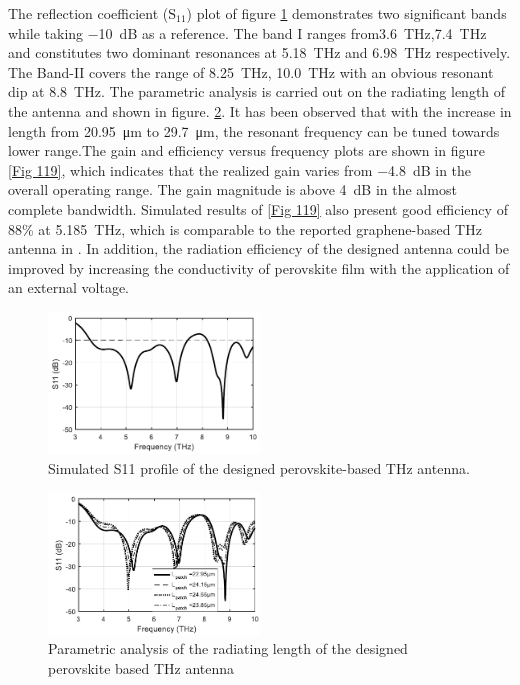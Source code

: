 \documentclass[12pt]{suhbook}
\begin{document}
The reflection coefficient ($\mathrm{S_{11}}$) plot of figure \ref{Fig 17} demonstrates two significant bands while taking \SI{-10 }{\dB} as a reference. The band I ranges from\SI{3.6}{\THz},\SI{7.4}{\THz} and constitutes two dominant resonances at \SI{5.18}{\THz} and \SI{6.98}{\THz} respectively. The Band-II covers the range of \SI{8.25}{\THz}, \SI{10.0}{\THz} with an obvious resonant dip at \SI{8.8}{\THz}. The parametric analysis is carried out on the radiating length of the antenna and shown in figure. \ref{Fig 18}. It has been observed that with the increase in length from \SI{20.95}{\um} to \SI{29.7}{\um}, the resonant frequency can be tuned towards lower range.The gain and efficiency versus frequency plots are shown in figure \ref{Fig 119}, which indicates that the realized gain varies from \SI{-4.8 }{\dB} in the overall operating range. The gain magnitude is above \SI{4 }{\dB} in the almost complete bandwidth. Simulated results of \ref{Fig 119} also present good efficiency of 88\% at \SI{5.185}{\THz}, which is comparable to the reported graphene-based THz antenna in \cite{dashti2018graphene}. In addition, the radiation efficiency of the designed antenna could be improved by increasing the conductivity of perovskite film with the application of an external voltage.
% 
\begin{figure}[hbt!]
\centering
\includegraphics[width=0.5\textwidth]{17}
\caption{Simulated S11 profile of the designed perovskite-based THz antenna.}
\label{Fig 17}
\end{figure}
\begin{figure}[hbt!]
\centering
\includegraphics[width=0.5\textwidth]{18}
\caption{Parametric analysis of the radiating length of the designed perovskite based THz antenna}
\label{Fig 18}
\end{figure}
\end{document}
